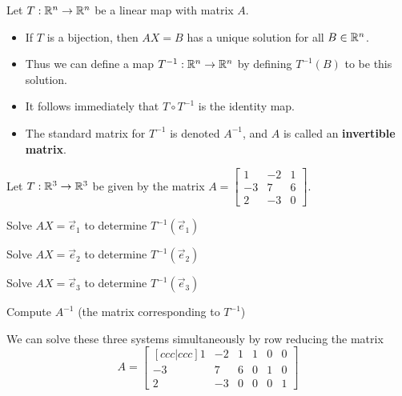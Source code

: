 
\begin{applicationActivities}{3}{23}

\begin{definition}
  Let $T: \mathbb{R}^n \rightarrow \mathbb{R}^n$ be a linear map with matrix $A$.

\begin{itemize}
\item  If $T$ is a bijection, then $AX=B$ has a unique solution for all $B \in \mathbb{R}^n$.  
\item Thus we can define a map $T^{-1} : \mathbb{R}^n \rightarrow \mathbb{R}^n$ by defining $T^{-1}(B)$ to be this solution.  
\item It follows immediately that $T \circ T^{-1}$ is the identity map.  
\item The standard matrix for $T^{-1}$ is denoted $A^{-1}$, and $A$ is called an {\bf invertible matrix}.
\end{itemize}

\end{definition}
\begin{activity}{20}
Let $T: \mathbb{R}^3 \rightarrow \mathbb{R}^3$ be given by the matrix $A=\begin{bmatrix} 1 & -2 & 1 \\ -3 & 7 & 6 \\ 2 & -3 & 0 \end{bmatrix}$.
  \begin{subactivity}
  Solve $AX=\vec{e}_1$ to determine $T^{-1}(\vec{e}_1)$
  \end{subactivity}
  \begin{subactivity}
   Solve $AX=\vec{e}_2$ to determine $T^{-1}(\vec{e}_2)$
  \end{subactivity}
  \begin{subactivity}
   Solve $AX=\vec{e}_3$ to determine $T^{-1}(\vec{e}_3)$
  \end{subactivity}
  \begin{subactivity}
  Compute $A^{-1}$ (the matrix corresponding to $T^{-1}$)
  \end{subactivity}
\end{activity}

\begin{observation}
We can solve these three systems simultaneously by row reducing the matrix 
$$A=\begin{bmatrix}[ccc|ccc] 1 & -2 & 1 & 1 & 0 & 0 \\ -3 & 7 & 6 & 0 & 1 & 0 \\ 2 & -3 & 0 & 0 & 0 & 1 \end{bmatrix}$$
\end{observation}



\end{applicationActivities}

